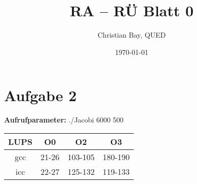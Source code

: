 \documentclass{article}
\title{RA -- R\"U Blatt 0}
\author{Christian Bay, QUED}
\date{\today}
\begin{document}
\maketitle
\section*{Aufgabe 2}

\textbf{Aufrufparameter:} ./Jacobi 6000 500

\begin{center}
	\begin{tabular}{| c || c | c | c |}
		LUPS & O0 & O2 & O3 \\
		\hline \hline
		gcc  & 21-26  & 103-105  & 180-190 \\
		\hline
		icc  & 22-27  & 125-132  & 119-133 \\
		\hline
	\end{tabular}
\end{center}
\end{document}
